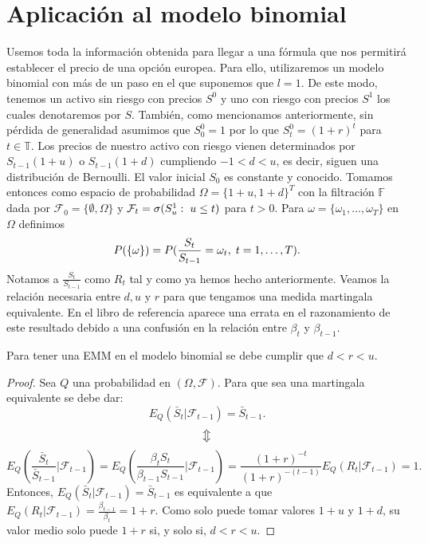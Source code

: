 \section{Aplicación al modelo binomial}
Usemos toda la información obtenida para llegar a una fórmula que nos permitirá establecer el precio de una opción europea. Para ello, utilizaremos un modelo binomial con más de un paso en el que suponemos que $ l = 1 $. De este modo, tenemos un activo sin riesgo con precios $ S^0 $ y uno con riesgo con precios $ S^1$ los cuales denotaremos por $ S $. También, como mencionamos anteriormente, sin pérdida de generalidad asumimos que $ S^0_0  = 1$ por lo que $ S_t^0 =  (1+r)^t $ para $ t \in \mathbb{T} $. Los precios de nuestro activo con riesgo vienen determinados por $ S_{t-1}(1+u) $ o $ S_{t-1}(1+d) $ cumpliendo $ -1 < d < u $, es decir, siguen una distribución de Bernoulli. El valor inicial $ S_0 $ es constante y conocido. Tomamos entonces como espacio de probabilidad $ \Omega = \{1+u,1+d\}^T $ con la filtración $ \mathbb{F} $ dada por $ \mathcal{F}_0 = \{\emptyset, \Omega\} $ y $ \mathcal{F}_t = \sigma(S_u^1: \hspace{1mm} u \leq t) $ para $ t >0 $. Para $ \omega = \{\omega_1,\dots,\omega_T\} $ en $ \Omega $ definimos
\[
P(\{\omega\}) = P(\frac{S_t}{S_{t-1}} = \omega_t, \hspace{1mm} t=1,\dots,T).
\]
Notamos a $ \frac{S_t}{S_{t-1}} $ como $ R_t $ tal y como ya hemos hecho anteriormente. Veamos la relación necesaria entre $ d,u \text{ y } r$ para que tengamos una medida martingala equivalente. En el libro de referencia aparece una errata en el razonamiento de este resultado debido a una confusión en la relación entre $ \beta_t $ y $ \beta_{t-1} $.
\bigskip
\begin{lemaBox}\label{cotasUpDown}
	Para tener una EMM en el modelo binomial se debe cumplir que $ d < r < u $.
\end{lemaBox}
\begin{proof}
	Sea $ Q $ una probabilidad en $ (\Omega, \mathcal{F}) $. Para que sea una martingala equivalente se debe dar:
	\[
	E_Q(\bar{S}_t | \mathcal{F}_{t-1}) = \bar{S}_{t-1}.
	\]
	\[
	\big\Updownarrow
	\]
	\[
	E_Q(\frac{\bar{S}_t}{\bar{S}_{t-1}} | \mathcal{F}_{t-1}) = E_Q(\frac{\beta_t S_t}{\beta_{t-1} S_{t-1}} | \mathcal{F}_{t-1}) =  \frac{(1+r)^{-t}}{(1+r)^{-(t-1)}} E_Q(R_t | \mathcal{F}_{t-1}) = 1.
	\]
	Entonces, $ E_Q(\bar{S}_t | \mathcal{F}_{t-1}) = \bar{S}_{t-1} $  es equivalente a que $ E_Q(R_t| \mathcal{F}_{t-1}) =\frac{\beta_{t-1}}{\beta_t}=1+r $. Como solo puede tomar valores $ 1+u $ y $ 1+d $, su valor medio solo puede $ 1+r $ si, y solo si, $ d < r < u $.
\end{proof}
\bigskip

